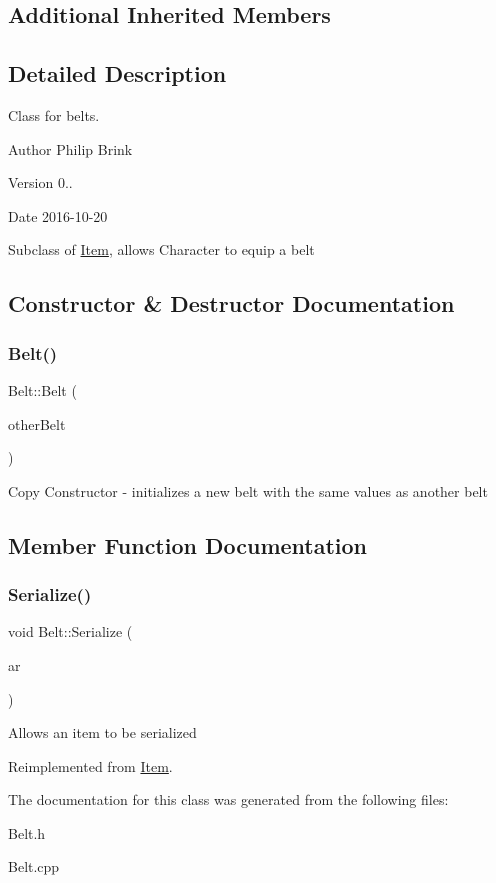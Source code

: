 \subsection*{Additional Inherited Members}


\subsection{Detailed Description}
Class for belts. 

\begin{DoxyAuthor}{Author}
Philip Brink 
\end{DoxyAuthor}
\begin{DoxyVersion}{Version}
0.. 
\end{DoxyVersion}
\begin{DoxyDate}{Date}
2016-\/10-\/20
\end{DoxyDate}
Subclass of \hyperlink{class_item}{Item}, allows Character to equip a belt 

\subsection{Constructor \& Destructor Documentation}
\hypertarget{class_belt_a0fe7148ac3d4fba7953f89cd1ca00443}{}\label{class_belt_a0fe7148ac3d4fba7953f89cd1ca00443} 
\subsubsection{\texorpdfstring{Belt()}{Belt()}}
{\footnotesize\ttfamily Belt\+::\+Belt (\begin{DoxyParamCaption}\item[{const \hyperlink{class_belt}{Belt} $\ast$}]{other\+Belt }\end{DoxyParamCaption})}

Copy Constructor -\/ initializes a new belt with the same values as another belt 

\subsection{Member Function Documentation}
\hypertarget{class_belt_a39c1f664a2f79f5dedac37546563f493}{}\label{class_belt_a39c1f664a2f79f5dedac37546563f493} 
\subsubsection{\texorpdfstring{Serialize()}{Serialize()}}
{\footnotesize\ttfamily void Belt\+::\+Serialize (\begin{DoxyParamCaption}\item[{C\+Archive \&}]{ar }\end{DoxyParamCaption})\hspace{0.3cm}{\ttfamily [virtual]}}

Allows an item to be serialized 

Reimplemented from \hyperlink{class_item_ad1eae21e57fc3ce3252080a4efbfb8e8}{Item}.



The documentation for this class was generated from the following files\+:\begin{DoxyCompactItemize}
\item 
Belt.\+h\item 
Belt.\+cpp\end{DoxyCompactItemize}
